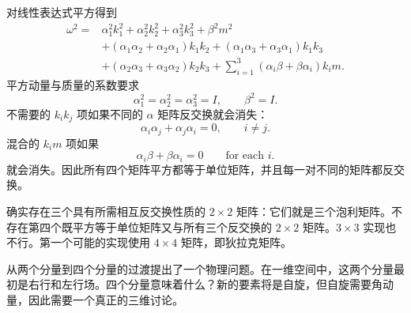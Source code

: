 对线性表达式平方得到
\begin{align}
\omega^2
={}&
\alpha_1^2k_1^2+\alpha_2^2k_2^2+\alpha_3^2k_3^2+\beta^2m^2
\nonumber\\
&+(\alpha_1\alpha_2+\alpha_2\alpha_1)k_1k_2
+(\alpha_1\alpha_3+\alpha_3\alpha_1)k_1k_3
\nonumber\\
&+(\alpha_2\alpha_3+\alpha_3\alpha_2)k_2k_3
+\sum_{i=1}^{3}(\alpha_i\beta+\beta\alpha_i)k_i m.
\end{align}
平方动量与质量的系数要求
\begin{equation}
\alpha_1^2=\alpha_2^2=\alpha_3^2=I,
\qquad
\beta^2=I.
\end{equation}
不需要的 \(k_i k_j\) 项如果不同的 \(\alpha\) 矩阵反交换就会消失：
\begin{equation}
\alpha_i\alpha_j+\alpha_j\alpha_i=0,
\qquad i\neq j.
\end{equation}
混合的 \(k_i m\) 项如果
\begin{equation}
\alpha_i\beta+\beta\alpha_i=0
\qquad
\text{for each }i.
\end{equation}
就会消失。因此所有四个矩阵平方都等于单位矩阵，并且每一对不同的矩阵都反交换。

确实存在三个具有所需相互反交换性质的 \(2\times2\) 矩阵：它们就是三个泡利矩阵。不存在第四个既平方等于单位矩阵又与所有三个反交换的 \(2\times2\) 矩阵。\(3\times3\) 实现也不行。第一个可能的实现使用 \(4\times4\) 矩阵，即狄拉克矩阵。

从两个分量到四个分量的过渡提出了一个物理问题。在一维空间中，这两个分量最初是右行和左行场。四个分量意味着什么？新的要素将是自旋，但自旋需要角动量，因此需要一个真正的三维讨论。

